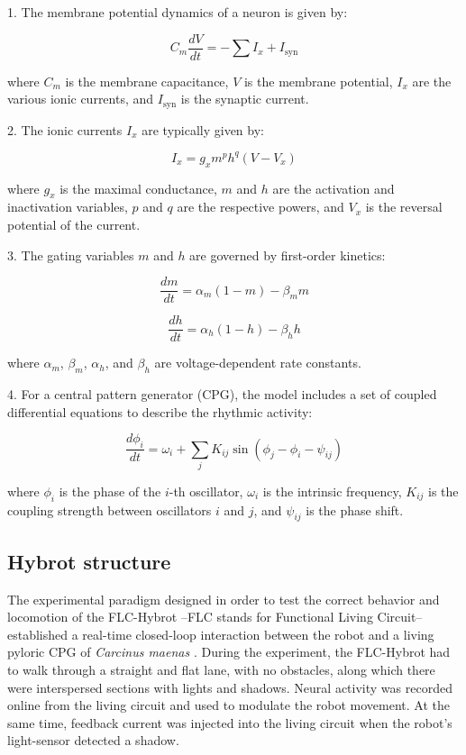 1. The membrane potential dynamics of a neuron is given by:

\begin{equation}
	C_m \frac{dV}{dt} = -\sum I_x + I_{\text{syn}}
\end{equation}

where \( C_m \) is the membrane capacitance, \( V \) is the membrane potential, \( I_x \) are the various ionic currents, and \( I_{\text{syn}} \) is the synaptic current.

2. The ionic currents \( I_x \) are typically given by:

\begin{equation}
	I_x = g_x m^p h^q (V - V_x)
\end{equation}

where \( g_x \) is the maximal conductance, \( m \) and \( h \) are the activation and inactivation variables, \( p \) and \( q \) are the respective powers, and \( V_x \) is the reversal potential of the current.

3. The gating variables \( m \) and \( h \) are governed by first-order kinetics:

\begin{equation}
	\frac{dm}{dt} = \alpha_m (1 - m) - \beta_m m
\end{equation}

\begin{equation}
	\frac{dh}{dt} = \alpha_h (1 - h) - \beta_h h
\end{equation}

where \( \alpha_m \), \( \beta_m \), \( \alpha_h \), and \( \beta_h \) are voltage-dependent rate constants.

4. For a central pattern generator (CPG), the model includes a set of coupled differential equations to describe the rhythmic activity:

\begin{equation}
	\frac{d\phi_i}{dt} = \omega_i + \sum_j K_{ij} \sin(\phi_j - \phi_i - \psi_{ij})
\end{equation}

where \( \phi_i \) is the phase of the \( i \)-th oscillator, \( \omega_i \) is the intrinsic frequency, \( K_{ij} \) is the coupling strength between oscillators \( i \) and \( j \), and \( \psi_{ij} \) is the phase shift.



\subsection{Hybrot structure}
\label{sec:robot setup}
The experimental paradigm designed in order to test the correct behavior and locomotion of the FLC-Hybrot --FLC stands for Functional Living Circuit-- established a real-time closed-loop interaction between the robot and a living pyloric CPG of \textit{Carcinus maenas} \cite{elices_robust_2019}. During the experiment, the FLC-Hybrot had to walk through a straight and flat lane, with no obstacles, along which there were interspersed sections with lights and shadows. Neural activity was recorded online from the living circuit and used to modulate the robot movement. At the same time, feedback current was injected into the living circuit when the robot's light-sensor detected a shadow.

